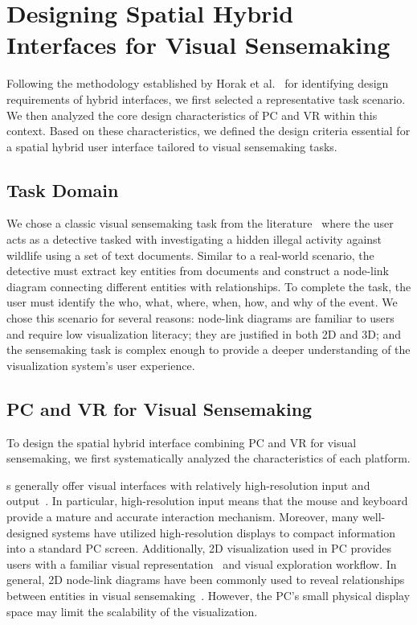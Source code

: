 \section{Designing Spatial Hybrid Interfaces for Visual Sensemaking}
\label{sec:pc_vr_design}



Following the methodology established by Horak et al.~\cite{horak2018david} for identifying design requirements of hybrid interfaces, we first selected a representative task scenario. We then analyzed the core design characteristics of PC and VR within this context. Based on these characteristics, we defined the design criteria essential for a spatial hybrid user interface tailored to visual sensemaking tasks.

\subsection{Task Domain}
\label{secc:task}
We chose a classic visual sensemaking task from the literature~\cite{mahyar2014supporting,balakrishnan2008visualizations,tong2023towards,yang2024putting} where the user acts as a detective tasked with investigating a hidden illegal activity against wildlife using a set of text documents. 
Similar to a real-world scenario, the detective must extract key entities from documents and construct a node-link diagram connecting different entities with relationships. 
To complete the task, the user must identify the who, what, where, when, how, and why of the event.
We chose this scenario for several reasons: node-link diagrams are familiar to users and require low visualization literacy; they are justified in both 2D and 3D; and the sensemaking task is complex enough to provide a deeper understanding of the visualization system's user experience.

\subsection{PC and VR for Visual Sensemaking}
\label{sec:pc-vr-only-design}
To design the spatial hybrid interface combining PC and VR for visual sensemaking, we first systematically analyzed the characteristics of each platform.

s generally offer visual interfaces with relatively high-resolution input and output~\cite{feiner1991hybrid}. 
In particular, high-resolution input means that the mouse and keyboard provide a mature and accurate interaction mechanism. Moreover, many well-designed systems have utilized high-resolution displays to compact information into a standard PC screen. 
Additionally, 2D visualization used in PC provides users with a familiar visual representation~\cite{riegler2020cross} and visual exploration workflow.
In general, 2D node-link diagrams have been commonly used to reveal relationships between entities in visual sensemaking~\cite{mahyar2014supporting,balakrishnan2008visualizations,lin2021taxthemis,perer2011visual}. 
However, the PC's small physical display space may limit the scalability of the visualization. 


